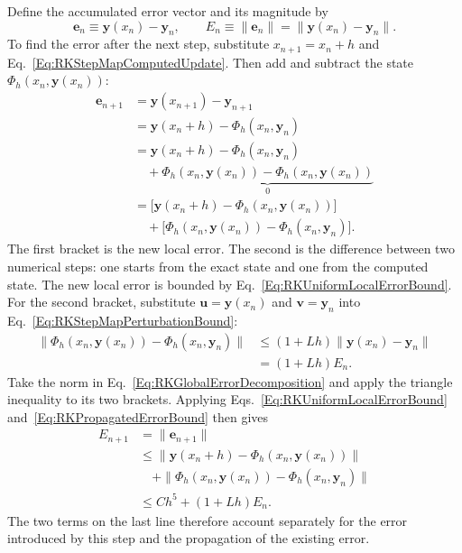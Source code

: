 Define the accumulated error vector and its magnitude by
\begin{equation}\label{Eq:RKGlobalErrorDefinition}
 \mathbf e_n\equiv\mathbf y(x_n)-\mathbf y_n,
 \qquad E_n\equiv\|\mathbf e_n\|
              =\|\mathbf y(x_n)-\mathbf y_n\|.
\end{equation}
To find the error after the next step, substitute $x_{n+1}=x_n+h$ and
Eq.~\ref{Eq:RKStepMapComputedUpdate}. Then add and subtract the state
$\Phi_h(x_n,\mathbf y(x_n))$:
\begin{equation}\label{Eq:RKGlobalErrorDecomposition}
\begin{aligned}
 \mathbf e_{n+1}
 &=\mathbf y(x_{n+1})-\mathbf y_{n+1}\\
 &=\mathbf y(x_n+h)-\Phi_h(x_n,\mathbf y_n)\\
 &=\mathbf y(x_n+h)-\Phi_h(x_n,\mathbf y_n)\\
 &\quad+\underbrace{\Phi_h(x_n,\mathbf y(x_n))
                    -\Phi_h(x_n,\mathbf y(x_n))}_{0}\\
 &=\bigl[\mathbf y(x_n+h)-\Phi_h(x_n,\mathbf y(x_n))\bigr]\\
 &\quad+\bigl[\Phi_h(x_n,\mathbf y(x_n))-\Phi_h(x_n,\mathbf y_n)\bigr].
\end{aligned}
\end{equation}
The first bracket is the new local error. The second is the difference
between two numerical steps: one starts from the exact state and one from
the computed state. The new local error is bounded by
Eq.~\ref{Eq:RKUniformLocalErrorBound}. For the second bracket, substitute
$\mathbf u=\mathbf y(x_n)$ and $\mathbf v=\mathbf y_n$ into
Eq.~\ref{Eq:RKStepMapPerturbationBound}:
\begin{equation}\label{Eq:RKPropagatedErrorBound}
\begin{aligned}
 \|\Phi_h(x_n,\mathbf y(x_n))-\Phi_h(x_n,\mathbf y_n)\|
 &\leq(1+Lh)\|\mathbf y(x_n)-\mathbf y_n\|\\
 &=(1+Lh)E_n.
\end{aligned}
\end{equation}
Take the norm in Eq.~\ref{Eq:RKGlobalErrorDecomposition} and apply the
triangle inequality to its two brackets. Applying
Eqs.~\ref{Eq:RKUniformLocalErrorBound} and~\ref{Eq:RKPropagatedErrorBound}
then gives
\begin{equation}\label{Eq:RKGlobalErrorRecurrence}
\begin{aligned}
 E_{n+1}
 &=\|\mathbf e_{n+1}\|\\
 &\leq\|\mathbf y(x_n+h)-\Phi_h(x_n,\mathbf y(x_n))\|\\
 &\quad+\|\Phi_h(x_n,\mathbf y(x_n))-\Phi_h(x_n,\mathbf y_n)\|\\
 &\leq Ch^5+(1+Lh)E_n.
\end{aligned}
\end{equation}
The two terms on the last line therefore account separately for the
error introduced by this step and the propagation of the existing error.

